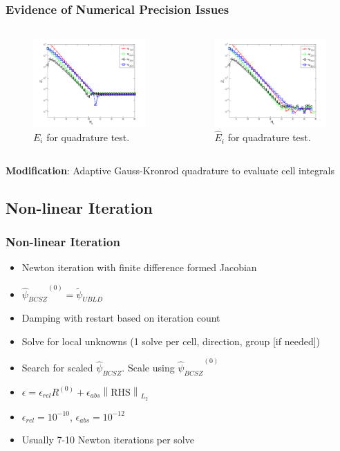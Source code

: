 \documentclass{beamer}
\newcommand{\norm}[1]{\ensuremath{\left\lVert #1 \right\rVert}}  %
\newcommand{\BCSZH}{\ensuremath{\widehat{\psi}_{BCSZ}}}
\begin{document}
\begin{frame}
\frametitle{Evidence of Numerical Precision Issues}
\vspace{-.75in}
\begin{columns}[t]
\begin{figure}[h]
\centering
		\includegraphics[width=2.25in]{err_gauss_to_matlab_exact.png}
		\caption{$E_i$ for quadrature test.}
		\label{fig:quad_err}
\end{figure}

\begin{figure}
\centering
		\includegraphics[width=2.25in]{err_gauss_to_highest_gauss.png}
		\caption{$\widehat{E}_i$ for quadrature test.}
		\label{fig:no_err}
\end{figure}
\end{columns}
\vspace{0.1in}
{\bf Modification}: Adaptive Gauss-Kronrod quadrature to evaluate cell integrals
\end{frame}

\subsection{Non-linear Iteration}
\begin{frame}
\frametitle{Non-linear Iteration}
\begin{itemize}
\item Newton iteration with finite difference formed Jacobian
\item $\BCSZH^{(0)} = \widetilde{\psi}_{UBLD}$
\item Damping with restart based on iteration count
\item Solve for local unknowns (1 solve per cell, direction, group [if needed])
\item Search for scaled \BCSZH.  Scale using $\BCSZH^{(0)}$
\item $\epsilon = \epsilon_{rel} R^{(0)} + \epsilon_{abs} \norm{\text{RHS}}_{L_2}$
\item $\epsilon_{rel} = 10^{-10}$, $\epsilon_{abs} = 10^{-12}$
\item Usually 7-10 Newton iterations per solve
\end{itemize}
\end{frame}
\end{document}

